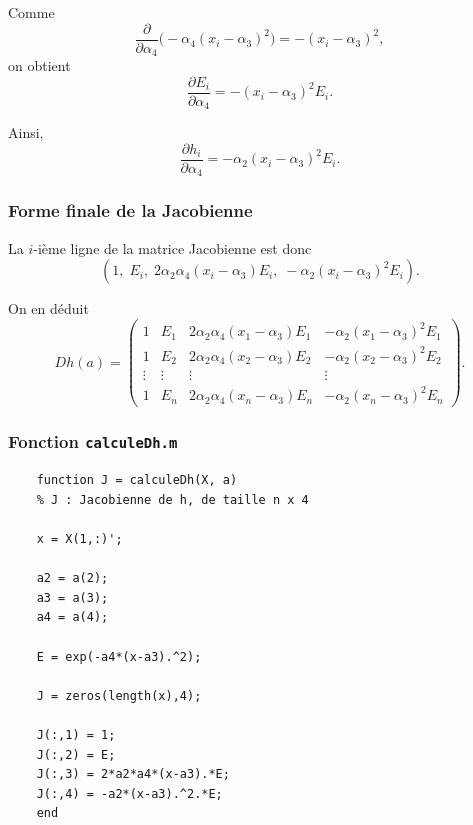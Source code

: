\documentclass[a4paper,12pt]{article}
\begin{document}
	Comme
	\begin{equation}
	\frac{\partial}{\partial \alpha_4}\big(-\alpha_4(x_i-\alpha_3)^2\big)
	=
	-(x_i-\alpha_3)^2,
	\end{equation}
	on obtient
	\begin{equation}
	\frac{\partial E_i}{\partial \alpha_4}
	=
	-(x_i-\alpha_3)^2E_i.
	\end{equation}
	
	Ainsi,
	\begin{equation}
	\frac{\partial h_i}{\partial \alpha_4}
	=
	-\alpha_2(x_i-\alpha_3)^2E_i.
	\end{equation}
	
	\subsubsection{Forme finale de la Jacobienne}
	
	La $i$-ième ligne de la matrice Jacobienne est donc
	\begin{equation}
	\left(
	1,\;
	E_i,\;
	2\alpha_2\alpha_4(x_i-\alpha_3)E_i,\;
	-\alpha_2(x_i-\alpha_3)^2E_i
	\right).
	\end{equation}
	
	On en déduit
	\begin{equation}
	Dh(a)=
	\begin{pmatrix}
	1 & E_1 & 2\alpha_2\alpha_4(x_1-\alpha_3)E_1 & -\alpha_2(x_1-\alpha_3)^2E_1 \\
	1 & E_2 & 2\alpha_2\alpha_4(x_2-\alpha_3)E_2 & -\alpha_2(x_2-\alpha_3)^2E_2 \\
	\vdots & \vdots & \vdots & \vdots \\
	1 & E_n & 2\alpha_2\alpha_4(x_n-\alpha_3)E_n & -\alpha_2(x_n-\alpha_3)^2E_n
	\end{pmatrix}.
	\end{equation}
	
	\subsubsection*{Fonction \texttt{calculeDh.m}}
	
	\begin{verbatim}
	function J = calculeDh(X, a)
	% J : Jacobienne de h, de taille n x 4
	
	x = X(1,:)';
	
	a2 = a(2);
	a3 = a(3);
	a4 = a(4);
	
	E = exp(-a4*(x-a3).^2);
	
	J = zeros(length(x),4);
	
	J(:,1) = 1;
	J(:,2) = E;
	J(:,3) = 2*a2*a4*(x-a3).*E;
	J(:,4) = -a2*(x-a3).^2.*E;
	end
	\end{verbatim}
	
\end{document}

